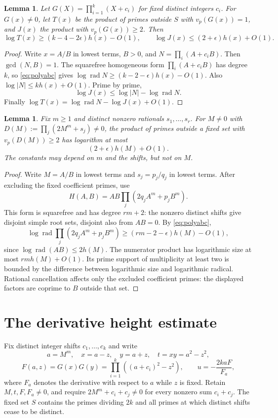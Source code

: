 \documentclass[11pt,a4paper]{article}
\newtheorem{lemma}[theorem]{Lemma}
\DeclareMathOperator{\rad}{rad}\DeclareMathOperator{\Tr}{Tr}
\begin{document}
\begin{lemma}\label{lem:simple}
Let $G(X)=\prod_{i=1}^k(X+c_i)$ for fixed distinct integers $c_i$.
For $G(x)\ne0$, let $T(x)$ be the product of primes outside $S$
with $v_p(G(x))=1$, and $J(x)$ the product with
$v_p(G(x))\ge2$. Then
\[
 \log T(x)\ge(k-4-2\epsilon)h(x)-O(1),\qquad
 \log J(x)\le(2+\epsilon)h(x)+O(1).
\]
\end{lemma}
\begin{proof}
Write $x=A/B$ in lowest terms, $B>0$, and
$N=\prod_i(A+c_iB)$. Then $\gcd(N,B)=1$.
The squarefree homogeneous form $\prod_i(A+c_iB)$ has degree $k$,
so \eqref{eq:polyabc} gives
$\log\rad N\ge(k-2-\epsilon)h(x)-O(1)$.
Also $\log|N|\le k h(x)+O(1)$. Prime by prime,
\[
 \log J(x)\le\log|N|-\log\rad N.
\]
Finally $\log T(x)=\log\rad N-\log J(x)+O(1)$.
\end{proof}

\begin{lemma}\label{lem:power-multiple}
Fix $m\ge1$ and distinct nonzero rationals $s_1,\ldots,s_r$.
For $M\ne0$ with $D(M):=\prod_j(2M^m+s_j)\ne0$, the product
of primes outside a fixed set with $v_p(D(M))\ge2$ has logarithm
at most
\[
                         (2+\epsilon)h(M)+O(1).
\]
The constants may depend on $m$ and the shifts, but not on $M$.
\end{lemma}
\begin{proof}
Write $M=A/B$ in lowest terms and $s_j=p_j/q_j$ in lowest terms.
After excluding the fixed coefficient primes, use
\[
 H(A,B)=AB\prod_j(2q_jA^m+p_jB^m).
\]
This form is squarefree and has degree $rm+2$: the nonzero distinct
shifts give disjoint simple root sets, disjoint also from $AB=0$.
By \eqref{eq:polyabc},
\[
 \log\rad\prod_j(2q_jA^m+p_jB^m)
              \ge(rm-2-\epsilon)h(M)-O(1),
\]
since $\log\rad(AB)\le2h(M)$.
The numerator product has logarithmic size at most $rm h(M)+O(1)$.
Its prime support of multiplicity at least two is bounded by the
difference between logarithmic size and logarithmic radical.
Rational cancellation affects only the excluded coefficient primes:
the displayed factors are coprime to $B$ outside that set.
\end{proof}

\section{The derivative height estimate}

Fix distinct integer shifts $c_1,\ldots,c_k$ and write
\[
 a=M^m,\quad x=a-z,\quad y=a+z,\quad t=xy=a^2-z^2,
\]
\[
 F(a,z)=G(x)G(y)=\prod_{i=1}^k((a+c_i)^2-z^2),\qquad
                         u=-\frac{2kaF}{F_a},
\]
where $F_a$ denotes the derivative with respect to $a$ while $z$ is
fixed. Retain $M,t,F,F_a\ne0$, and require
$2M^m+c_i+c_j\ne0$ for every nonzero sum $c_i+c_j$.
The fixed set $S$ contains the primes dividing $2k$ and
all primes at which distinct shifts cease to be distinct.
\end{document}
